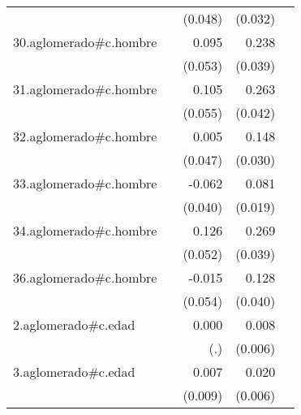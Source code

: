 {\begin{longtable}{l*{4}{D{.}{.}{-1}}}
            &                     &     (0.048)         &     (0.032)         &                     \\
\addlinespace
30.aglomerado#c.hombre&                     &       0.095         &       0.238\sym{***}&                     \\
            &                     &     (0.053)         &     (0.039)         &                     \\
\addlinespace
31.aglomerado#c.hombre&                     &       0.105         &       0.263\sym{***}&                     \\
            &                     &     (0.055)         &     (0.042)         &                     \\
\addlinespace
32.aglomerado#c.hombre&                     &       0.005         &       0.148\sym{***}&                     \\
            &                     &     (0.047)         &     (0.030)         &                     \\
\addlinespace
33.aglomerado#c.hombre&                     &      -0.062         &       0.081\sym{***}&                     \\
            &                     &     (0.040)         &     (0.019)         &                     \\
\addlinespace
34.aglomerado#c.hombre&                     &       0.126\sym{*}  &       0.269\sym{***}&                     \\
            &                     &     (0.052)         &     (0.039)         &                     \\
\addlinespace
36.aglomerado#c.hombre&                     &      -0.015         &       0.128\sym{**} &                     \\
            &                     &     (0.054)         &     (0.040)         &                     \\
\addlinespace
2.aglomerado#c.edad&                     &       0.000         &       0.008         &                     \\
            &                     &         (.)         &     (0.006)         &                     \\
\addlinespace
3.aglomerado#c.edad&                     &       0.007         &       0.020\sym{***}&                     \\
            &                     &     (0.009)         &     (0.006)         &                     \\

\end{longtable}}
